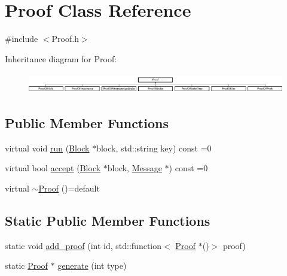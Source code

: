 \hypertarget{classProof}{}\section{Proof Class Reference}
\label{classProof}


{\ttfamily \#include $<$Proof.\+h$>$}

Inheritance diagram for Proof\+:\begin{figure}[H]
\begin{center}
\leavevmode
\includegraphics[height=0.914286cm]{classProof}
\end{center}
\end{figure}
\subsection*{Public Member Functions}
\begin{DoxyCompactItemize}
\item 
virtual void \mbox{\hyperlink{classProof_a6ab9f6c3f603447e3a9c7c932b5deac4}{run}} (\mbox{\hyperlink{classBlock}{Block}} $\ast$block, std\+::string key) const =0
\item 
virtual bool \mbox{\hyperlink{classProof_a358b3883eb33b8ecc93f74cb6313679a}{accept}} (\mbox{\hyperlink{classBlock}{Block}} $\ast$block, \mbox{\hyperlink{classMessage}{Message}} $\ast$) const =0
\item 
virtual \mbox{\hyperlink{classProof_a7d4b4e1b7e891dc1d437ef4095f778df}{$\sim$\+Proof}} ()=default
\end{DoxyCompactItemize}
\subsection*{Static Public Member Functions}
\begin{DoxyCompactItemize}
\item 
static void \mbox{\hyperlink{classProof_a71874539fdbcc93c15594b889c95225b}{add\+\_\+proof}} (int id, std\+::function$<$ \mbox{\hyperlink{classProof}{Proof}} $\ast$()$>$ proof)
\item 
static \mbox{\hyperlink{classProof}{Proof}} $\ast$ \mbox{\hyperlink{classProof_a267f0f4587babb59884b5f280e2d54c8}{generate}} (int type)
\end{DoxyCompactItemize}
